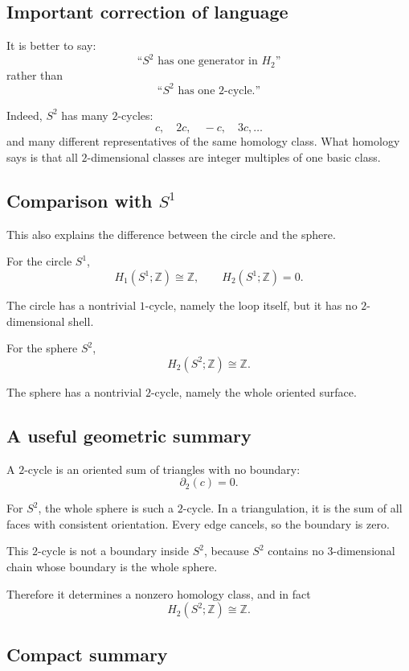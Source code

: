\documentclass[12pt,a4paper]{article}
\newcommand{\Z}{\mathbb{Z}}
\theoremstyle{notespace}
\begin{document}
\subsection{Important correction of language}

It is better to say:
\[
\text{``\(S^2\) has one generator in \(H_2\)''}
\]
rather than
\[
\text{``\(S^2\) has one \(2\)-cycle.''}
\]

Indeed, \(S^2\) has many \(2\)-cycles:
\[
c,\quad 2c,\quad -c,\quad 3c,\dots
\]
and many different representatives of the same homology class. What homology says is that all \(2\)-dimensional classes are integer multiples of one basic class.

\subsection{Comparison with \(S^1\)}

This also explains the difference between the circle and the sphere.

For the circle \(S^1\),
\[
H_1(S^1;\Z)\cong \Z,
\qquad
H_2(S^1;\Z)=0.
\]

The circle has a nontrivial \(1\)-cycle, namely the loop itself, but it has no \(2\)-dimensional shell.

For the sphere \(S^2\),
\[
H_2(S^2;\Z)\cong \Z.
\]

The sphere has a nontrivial \(2\)-cycle, namely the whole oriented surface.

\subsection{A useful geometric summary}

A \(2\)-cycle is an oriented sum of triangles with no boundary:
\[
\partial_2(c)=0.
\]

For \(S^2\), the whole sphere is such a \(2\)-cycle. In a triangulation, it is the sum of all faces with consistent orientation. Every edge cancels, so the boundary is zero.

This \(2\)-cycle is not a boundary inside \(S^2\), because \(S^2\) contains no \(3\)-dimensional chain whose boundary is the whole sphere.

Therefore it determines a nonzero homology class, and in fact
\[
H_2(S^2;\Z)\cong \Z.
\]

\subsection{Compact summary}
\end{document}
